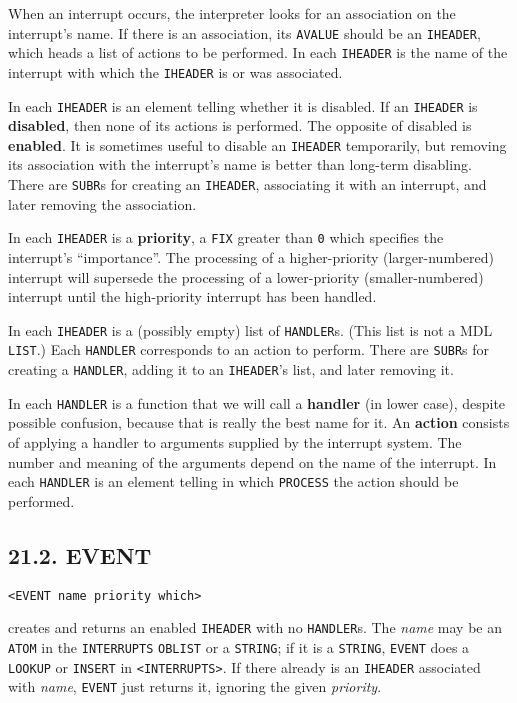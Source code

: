 \documentclass[a4paper,]{article}
\begin{document}
When an interrupt occurs, the interpreter looks for an association on the interrupt's name. If there is an association, its
\texttt{AVALUE} should be an \texttt{IHEADER}, which heads a list of actions to be performed. In
each \texttt{IHEADER} is the name of the interrupt with which the \texttt{IHEADER} is or was associated.

In each \texttt{IHEADER} is an element telling whether it is disabled. If an \texttt{IHEADER} is \textbf{disabled}, then
none of its actions is performed. The opposite of disabled is \textbf{enabled}. It is sometimes useful to disable an
\texttt{IHEADER} temporarily, but removing its association with the interrupt's name is better than long-term disabling.
There are \texttt{SUBR}s for creating an \texttt{IHEADER}, associating it with an interrupt, and later removing the
association.

In each \texttt{IHEADER} is a \textbf{priority}, a \texttt{FIX} greater than \texttt{0} which specifies the interrupt's
``importance''. The processing of a higher-priority (larger-numbered) interrupt will supersede the processing of a
lower-priority (smaller-numbered) interrupt until the high-priority interrupt has been handled.

In each \texttt{IHEADER} is a (possibly empty) list of \texttt{HANDLER}s. (This list is not a MDL
\texttt{LIST}.) Each \texttt{HANDLER} corresponds to an action to perform. There are \texttt{SUBR}s for creating a
\texttt{HANDLER}, adding it to an \texttt{IHEADER}'s list, and later removing it.

In each \texttt{HANDLER} is a function that we will call a \textbf{handler} (in lower case), despite possible confusion,
because that is really the best name for it. An \textbf{action} consists of applying a handler to arguments supplied by the
interrupt system. The number and meaning of the arguments depend on the name of the interrupt. In each \texttt{HANDLER} is
an element telling in which \texttt{PROCESS} the action should be performed.

\subsection{21.2. EVENT}\label{event}

\begin{verbatim}
<EVENT name priority which>
\end{verbatim}

 creates and returns an enabled \texttt{IHEADER} with no \texttt{HANDLER}s. The \emph{name}
may be an \texttt{ATOM} in the \texttt{INTERRUPTS} \texttt{OBLIST} or a \texttt{STRING}; if it is a \texttt{STRING},
\texttt{EVENT} does a \texttt{LOOKUP} or \texttt{INSERT} in \texttt{\textless{}INTERRUPTS\textgreater{}}. If there already
is an \texttt{IHEADER} associated with \emph{name}, \texttt{EVENT} just returns it, ignoring the given \emph{priority}.
\end{document}
